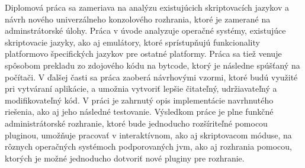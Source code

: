 Diplomová práca sa zameriava na analýzu existujúcich skriptovacích jazykov a návrh nového univerzálneho konzolového rozhrania, ktoré je  zamerané na adminstrátorské úlohy. Práca v úvode analyzuje operačné systémy, existujúce skriptovacie jazyky, ako aj emulátory, ktoré sprístupňujú funkcionality platformovo špecifických jazykov pre ostatné platformy. Práca sa  tiež venuje spôsobom prekladu zo zdojového kódu na bytcode, ktorý je následne spúšťaný na počítači. V ďalšej časti sa práca zaoberá návrhovými vzormi, ktoré budú využité pri vytváraní aplikácie, a umožnia vytvoriť lepšie čitateľný, udržiavateľný a modifikovateľný kód. V práci je zahrnutý opis implementácie navrhnutého riešenia, ako aj jeho následné testovanie. Výsledkom práce je plne funkčné administrátorské rozhranie, ktoré bude jednoducho rozšíriteľné pomocou pluginou, umožňuje pracovať v interaktívnom, ako aj skriptovacom móduse, na rôznych operačných systémoch podporovaných \gls{jvm}, ako aj rozhrania pomocou, ktorých je možné jednoducho dotvoriť nové pluginy pre rozhranie.

